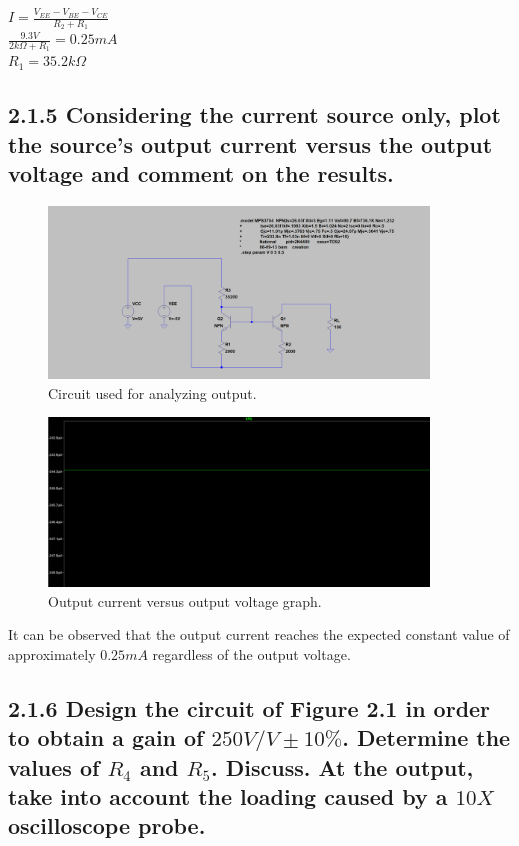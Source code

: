 \documentclass[12pt]{article}
\begin{document}
$I = \frac{V_{EE} - V_{BE} - V_{CE}}{R_2 + R_1}$ \\

$\frac{9.3V}{2k\Omega + R_1} = 0.25mA$ \\

$R_1 = 35.2k\Omega$


\subsection*{2.1.5 Considering the current source only, plot the source’s output current versus the output voltage and comment on the results.}

\begin{figure}[H]
\centering
\includegraphics[width=0.9\textwidth]{Screenshots/Circuit_215.png}
\caption{\label{fig:current-circuit} Circuit used for analyzing output.}
\end{figure}

\begin{figure}[H]
\centering
\includegraphics[width=0.9\textwidth]{Screenshots/Graph_215.png}
\caption{\label{fig:current-voltage} Output current versus output voltage graph.}
\end{figure}

It can be observed that the output current reaches the expected constant value of approximately $0.25mA$ regardless of the output voltage.

\subsection*{2.1.6 Design the circuit of Figure 2.1 in order to obtain a gain of $250V/V ±10\%$. Determine the values of $R_4$ and $R_5$. Discuss. At the output, take into account the loading caused by a $10X$ oscilloscope probe.}
\end{document}
